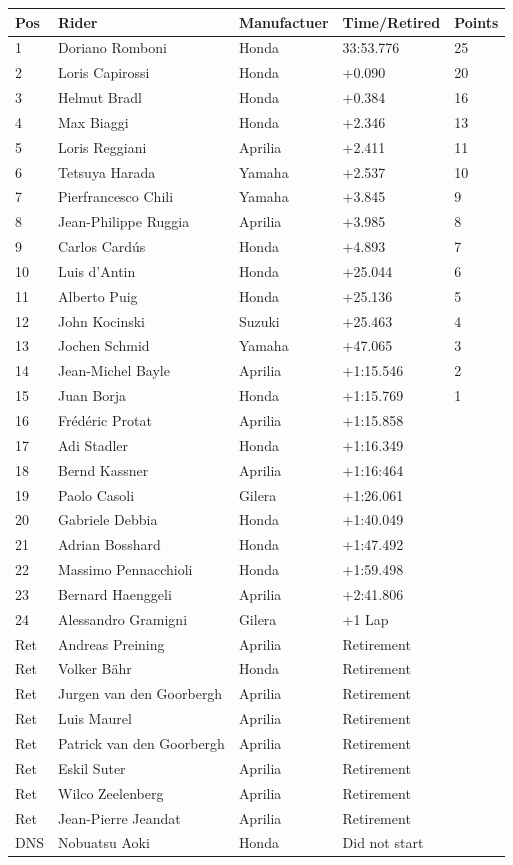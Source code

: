 \documentclass{article}
\begin{document}
\begin{tabular}{lllll}
\toprule
Pos & Rider & Manufactuer & Time/Retired & Points \\
\midrule
1 & Doriano Romboni & Honda & 33:53.776 & 25 \\
2 & Loris Capirossi & Honda & +0.090 & 20 \\
3 & Helmut Bradl & Honda & +0.384 & 16 \\
4 & Max Biaggi & Honda & +2.346 & 13 \\
5 & Loris Reggiani & Aprilia & +2.411 & 11 \\
6 & Tetsuya Harada & Yamaha & +2.537 & 10 \\
7 & Pierfrancesco Chili & Yamaha & +3.845 & 9 \\
8 & Jean-Philippe Ruggia & Aprilia & +3.985 & 8 \\
9 & Carlos Cardús & Honda & +4.893 & 7 \\
10 & Luis d'Antin & Honda & +25.044 & 6 \\
11 & Alberto Puig & Honda & +25.136 & 5 \\
12 & John Kocinski & Suzuki & +25.463 & 4 \\
13 & Jochen Schmid & Yamaha & +47.065 & 3 \\
14 & Jean-Michel Bayle & Aprilia & +1:15.546 & 2 \\
15 & Juan Borja & Honda & +1:15.769 & 1 \\
16 & Frédéric Protat & Aprilia & +1:15.858 &  \\
17 & Adi Stadler & Honda & +1:16.349 &  \\
18 & Bernd Kassner & Aprilia & +1:16:464 &  \\
19 & Paolo Casoli & Gilera & +1:26.061 &  \\
20 & Gabriele Debbia & Honda & +1:40.049 &  \\
21 & Adrian Bosshard & Honda & +1:47.492 &  \\
22 & Massimo Pennacchioli & Honda & +1:59.498 &  \\
23 & Bernard Haenggeli & Aprilia & +2:41.806 &  \\
24 & Alessandro Gramigni & Gilera & +1 Lap &  \\
Ret & Andreas Preining & Aprilia & Retirement &  \\
Ret & Volker Bähr & Honda & Retirement &  \\
Ret & Jurgen van den Goorbergh & Aprilia & Retirement &  \\
Ret & Luis Maurel & Aprilia & Retirement &  \\
Ret & Patrick van den Goorbergh & Aprilia & Retirement &  \\
Ret & Eskil Suter & Aprilia & Retirement &  \\
Ret & Wilco Zeelenberg & Aprilia & Retirement &  \\
Ret & Jean-Pierre Jeandat & Aprilia & Retirement &  \\
DNS & Nobuatsu Aoki & Honda & Did not start &  \\
\bottomrule
\end{tabular}
\end{document}
